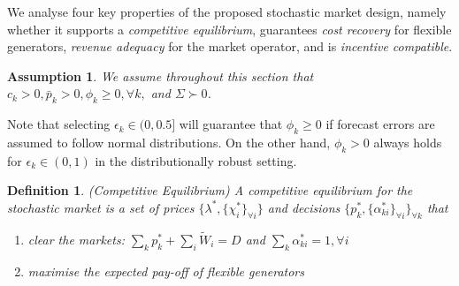 \documentclass{article}
\newtheorem{definition}{Definition}
\newtheorem{assumption}{Assumption}
\begin{document}
We analyse four key properties of the proposed stochastic market design, namely whether it supports a \textit{competitive equilibrium}, guarantees \textit{cost recovery} for flexible generators, \textit{revenue adequacy} for the market operator, and is \textit{incentive compatible}.

\begin{assumption}\label{StrictConvexity}
We assume throughout this section that $c_k > 0, \bar{p}_k > 0, \phi_k \ge 0, \forall k,$ and $\Sigma \succ 0$.
\end{assumption}

Note that selecting $\epsilon_k \in (0, 0.5]$ will guarantee that $\phi_k \ge 0$ if forecast errors are assumed to follow normal distributions. On the other hand, $\phi_k > 0$ always holds for $\epsilon_k \in (0, 1)$ in the distributionally robust setting.

\begin{definition}
(Competitive Equilibrium) A competitive equilibrium for the stochastic market is a set of prices $\{\lambda^*, \{\chi_i^*\}_{\forall i}\}$ and decisions $\{p_k^*, \{\alpha_{ki}^*\}_{\forall i}\}_{\forall k}$ that\vspace{-5pt}
\begin{enumerate}
\item clear the markets: $\sum_k p_k^* + \sum_i \tilde{W}_i = D$ and $\sum_k \alpha_{ki}^* = 1, \forall i$\vspace{-5pt}
\item maximise the expected pay-off of flexible generators
\end{enumerate}
\end{definition}
\end{document}
